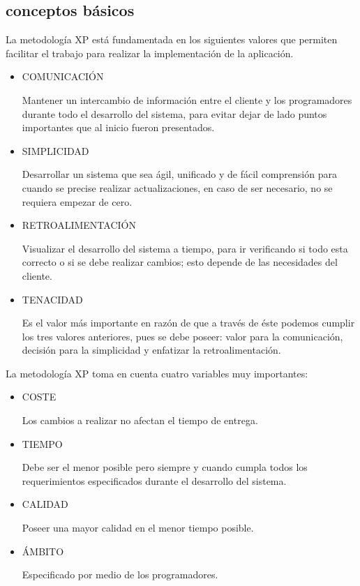 \documentclass[12pt,a4paper]{article}
\begin{document}
\subsection*{conceptos básicos}
La metodología XP está fundamentada en los siguientes valores que permiten facilitar el trabajo para realizar la implementación de la aplicación.
\begin{itemize}
    \item COMUNICACIÓN\par
    Mantener un intercambio de información entre el cliente y los programadores durante todo el desarrollo del sistema, para evitar dejar de lado puntos importantes que al inicio fueron presentados.
    \item  SIMPLICIDAD\par
    Desarrollar un sistema que sea ágil, unificado y de fácil comprensión para cuando se precise realizar actualizaciones, en caso de ser necesario, no se requiera empezar de cero.
    \item  RETROALIMENTACIÓN\par
    Visualizar el desarrollo del sistema a tiempo, para ir verificando si todo esta correcto o si se debe realizar cambios; esto depende de las necesidades del cliente.
    \item  TENACIDAD\par
    Es el valor más importante en razón de que a través de éste podemos cumplir los tres valores anteriores, pues se debe poseer: valor para la comunicación, decisión para la simplicidad y enfatizar la retroalimentación.
\end{itemize}

La metodología XP toma en cuenta cuatro variables muy importantes:
\begin{itemize}
    \item COSTE\par
    Los cambios a realizar no afectan el tiempo de entrega.
    \item TIEMPO\par
    Debe ser el menor posible pero siempre y cuando cumpla todos los requerimientos especificados durante el desarrollo del sistema.
    \item CALIDAD\par
    Poseer una mayor calidad en el menor tiempo posible.
    \item ÁMBITO\par
    Especificado por medio de los programadores.
\end{itemize}
\end{document}
